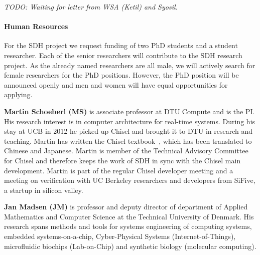 \documentclass[fleqn,12pt]{article}
\newcommand{\todo}[1]{{\it TODO: #1}}
\begin{document}
\todo{Waiting for letter from WSA (Ketil) and Syosil.}

%

\paragraph*{Human Resources}

For the SDH project we request funding of two PhD students and a student researcher.
Each of the senior researchers will contribute to the SDH research project.
%
%
As the already named researchers are all male, we will actively search
for female researchers for the PhD positions.
However, the PhD position will be announced openly and men and women
will have equal opportunities for applying.


{\bf Martin Schoeberl (MS)} is associate professor at DTU Compute and is the PI.
His research interest is in computer architecture for real-time systems. During his stay
at UCB in 2012 he picked up Chisel and brought it to DTU in research and teaching.
Martin has written the Chisel textbook~\cite{chisel:book}, which has been translated
to Chinese and Japanese. Martin is member of the Technical Advisory Committee for
Chisel and therefore keeps the work of SDH in sync with the Chisel main development.
Martin is part of the regular Chisel developer meeting and a meeting on verification with
UC Berkeley researchers and developers from SiFive, a startup in silicon valley.


{\bf Jan Madsen (JM)} is professor and deputy director of department of Applied Mathematics
and Computer Science at the Technical University of Denmark. His research spans methods
and tools for systems engineering of computing systems, embedded systems-on-a-chip,
Cyber-Physical Systems (Internet-of-Things), microfluidic biochips (Lab-on-Chip) and
synthetic biology (molecular computing). 
\end{document}
